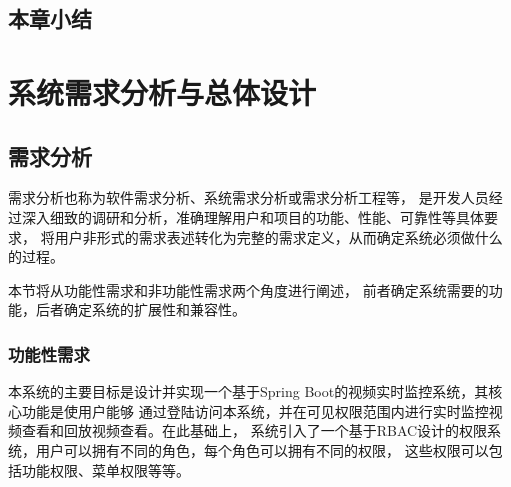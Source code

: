 

\section{本章小结}

\chapter{系统需求分析与总体设计}

\section{需求分析}

需求分析也称为软件需求分析、系统需求分析或需求分析工程等，
是开发人员经过深入细致的调研和分析，准确理解用户和项目的功能、性能、可靠性等具体要求，
将用户非形式的需求表述转化为完整的需求定义，从而确定系统必须做什么的过程。\cite{demand_analysis}

本节将从功能性需求和非功能性需求两个角度进行阐述，
前者确定系统需要的功能，后者确定系统的扩展性和兼容性。

\subsection{功能性需求}
本系统的主要目标是设计并实现一个基于Spring Boot的视频实时监控系统，其核心功能是使用户能够
通过登陆访问本系统，并在可见权限范围内进行实时监控视频查看和回放视频查看。在此基础上，
系统引入了一个基于RBAC设计的权限系统，用户可以拥有不同的角色，每个角色可以拥有不同的权限，
这些权限可以包括功能权限、菜单权限等等。

